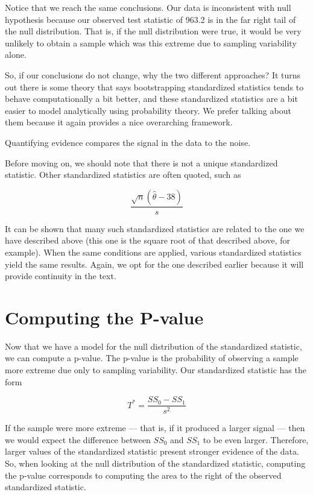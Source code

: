 \documentclass[]{book}
\theoremstyle{plain}
\theoremstyle{mydefn}
\theoremstyle{myexmpl}
\theoremstyle{remark}
\let\BeginKnitrBlock\begin \let\EndKnitrBlock\end
\let\BeginKnitrBlock\begin \let\EndKnitrBlock\end
\begin{document}
Notice that we reach the same conclusions. Our data is inconsistent with
null hypothesis because our observed test statistic of 963.2 is in the
far right tail of the null distribution. That is, if the null
distribution were true, it would be very unlikely to obtain a sample
which was this extreme due to sampling variability alone.

So, if our conclusions do not change, why the two different approaches?
It turns out there is some theory that says bootstrapping standardized
statistics tends to behave computationally a bit better, and these
standardized statistics are a bit easier to model analytically using
probability theory. We prefer talking about them because it again
provides a nice overarching framework.

\BeginKnitrBlock{rmdkeyidea}
Quantifying evidence compares the signal in the data to the noise.
\EndKnitrBlock{rmdkeyidea}

Before moving on, we should note that there is not a unique standardized
statistic. Other standardized statistics are often quoted, such as

\[\frac{\sqrt{n}\left(\widehat{\theta} - 38\right)}{s}\]

It can be shown that many such standardized statistics are related to
the one we have described above (this one is the square root of that
described above, for example). When the same conditions are applied,
various standardized statistics yield the same results. Again, we opt
for the one described earlier because it will provide continuity in the
text.

\section{Computing the P-value}\label{computing-the-p-value}

Now that we have a model for the null distribution of the standardized
statistic, we can compute a p-value. The p-value is the probability of
observing a sample more extreme due only to sampling variability. Our
standardized statistic has the form

\[T^* = \frac{SS_0 - SS_1}{s^2}\]

If the sample were more extreme --- that is, if it produced a larger
signal --- then we would expect the difference between \(SS_0\) and
\(SS_1\) to be even larger. Therefore, larger values of the standardized
statistic present stronger evidence of the data. So, when looking at the
null distribution of the standardized statistic, computing the p-value
corresponds to computing the area to the right of the observed
standardized statistic.
\end{document}
